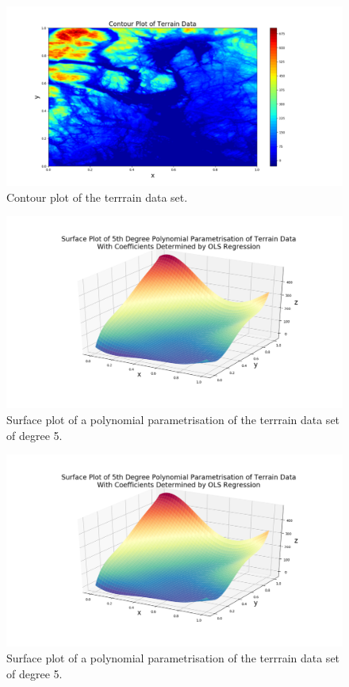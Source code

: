 \documentclass[reprint,english]{revtex4-1}
\begin{document}
\begin{figure}[h]
\centering
\includegraphics[scale=0.2,clip,trim={0cm 0cm 0cm 0cm}]{results/TerrainApprox/terrain_contour.png}
\caption{Contour plot of the terrrain data set.}\label{fig:terrrain_data_contour}
\end{figure}

\begin{figure}[h]
\centering
\includegraphics[scale=0.25,clip,trim={4cm 2cm 4cm 1cm}]{results/TerrainApprox/surface_deg5_OLS.png}
\caption{Surface plot of a polynomial parametrisation of the terrrain data set of degree 5.}\label{fig:terrrain_data_contour}
\end{figure}
\newpage

\begin{figure}[h]
\centering
\includegraphics[scale=0.25,clip,trim={4cm 2cm 4cm 1cm}]{results/TerrainApprox/surface_deg5_OLS.png}
\caption{Surface plot of a polynomial parametrisation of the terrrain data set of degree 5.}\label{fig:terrrain_data_param5}
\end{figure}
\end{document}
